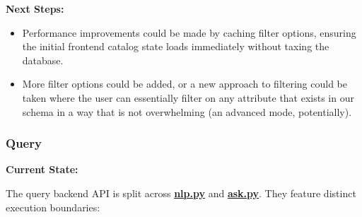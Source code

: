 \documentclass{article}
\begin{document}
\par{\textbf{Next Steps:}}
\begin{itemize}
  \item{Performance improvements could be made by caching filter options, ensuring the initial frontend catalog state loads immediately without taxing the database.}
  \item{More filter options could be added, or a new approach to filtering could be taken where the user can essentially filter on any attribute that exists in our schema in a way
  that is not overwhelming (an advanced mode, potentially).}
\end{itemize}

\subsubsection{Query}

\par{\textbf{Current State:}}
\par{The query backend API is split across \href{https://github.com/OCD-Rats-Capstone/OCD-Rat-Infrastructure/blob/main/src/ocd-rat-backend/routers/nlp.py}{\textbf{nlp.py}} and \href{https://github.com/OCD-Rats-Capstone/OCD-Rat-Infrastructure/blob/main/src/ocd-rat-backend/routers/ask.py}{\textbf{ask.py}}. They feature distinct execution boundaries:}
\end{document}
